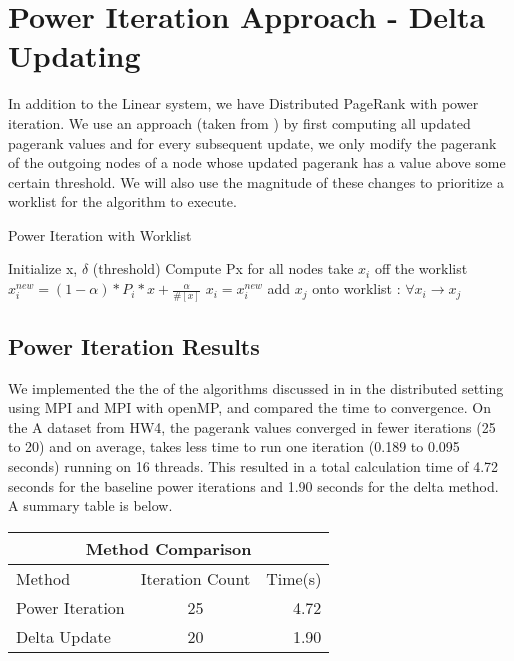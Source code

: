 \documentclass[a4paper,10pt]{article}
\begin{document}
\section{Power Iteration Approach - Delta Updating}
In addition to the Linear system, we have Distributed PageRank with power iteration. We use an approach (taken from \cite{Joyce}) by first computing all updated pagerank values and for every subsequent update, we only modify the pagerank of the outgoing nodes of a node whose updated pagerank has a value above some certain threshold. We will also use the magnitude of these changes to prioritize a worklist for the algorithm to execute. 
\newline
\begin{algorithm}
\caption{Power Iteration with Worklist}
\begin{algorithmic}[1]
  \STATE Initialize x, $\delta$ (threshold)
  \STATE Compute Px for all nodes
    \STATE take $x_{i}$ off the worklist
	\STATE $x_{i}^{new} = (1-\alpha)*P_{i}*x + \frac{\alpha}{\#[x]}$
		\STATE $x_{i} = x_{i}^{new}$
		\STATE add $x_{j}$ onto worklist : $\forall x_{i} \to x_{j}$
	\ENDIF
  \ENDIF
  \ENDWHILE
\end{algorithmic}
\end{algorithm}
\newline

\subsection{Power Iteration Results}
We implemented the the of the algorithms discussed in \cite{Joyce} in the distributed setting using MPI and MPI with openMP, and compared the time to convergence. On the A dataset from HW4, the pagerank values converged in fewer iterations (25 to 20) and on average, takes less time to run one iteration (0.189 to 0.095 seconds) running on 16 threads. This resulted in a total calculation time of 4.72 seconds for the baseline power iterations and 1.90 seconds for the delta method. A summary table is below.

\begin{center}
\begin{tabular}{l || c | r}
	\hline
	\multicolumn{3}{c}{Method Comparison} \\
	\hline\hline
	Method & Iteration Count & Time(s) \\
	\hline\hline
	Power Iteration & 25 & 4.72 \\
	Delta Update & 20 & 1.90 \\
\end{tabular}
\end{center}
\end{document}
